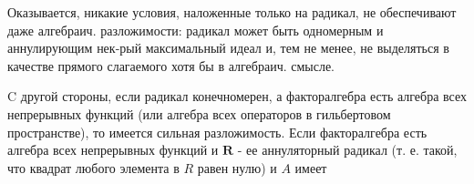 \documentclass[10pt]{article}
\begin{document}
Оказывается, никакие условия, наложенные только на радикал, не обеспечивают даже алгебраич. разложимости: радикал может быть одномерным и аннулирующим нек-рый максимальный идеал и, тем не менее, не выделяться в качестве прямого слагаемого хотя бы в алгебраич. смысле.



C другой стороны, если радикал конечномерен, а факторалгебра есть алгебра всех непрерывных функций (или алгебра всех операторов в гильбертовом пространстве), то имеется сильная разложимость. Если факторалгебра есть алгебра всех непрерывных функций и $\boldsymbol{R}$ - ее аннуляторный радикал (т. е. такой, что квадрат любого элемента в $R$ равен нулю) и $A$ имеет
\end{document}
